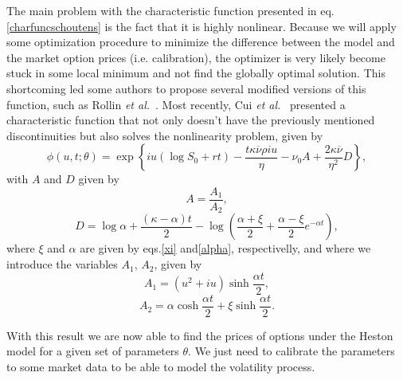 The main problem with the characteristic function presented in eq.\eqref{charfuncschoutens} is the fact that it is highly nonlinear. Because we will apply some optimization procedure to minimize the difference between the model and the market option prices (i.e. calibration), the optimizer is very likely become stuck in some local minimum and not find the globally optimal solution.
This shortcoming led some authors to propose several modified versions of this function, such as Rollin \textit{et al.}~\citep{Rollin}. Most recently, Cui \textit{et al.}~\citep{Cui} presented a characteristic function that not only doesn't have the previously mentioned discontinuities but also solves the nonlinearity problem, given by
\begin{equation}
\phi(u,t;\theta)=\exp\left\{iu\left(\log S_0+rt\right)-\frac{t\kappa\overline{\nu}\rho iu}{\eta}-\nu_0A+\frac{2\kappa\overline{\nu}}{\eta^2}D\right\},
\end{equation}
\noindent with $A$ and $D$ given by
\begin{equation}
A=\frac{A_1}{A_2},
\end{equation}
\begin{equation}
D=\log \alpha+\frac{(\kappa-\alpha) t}{2}-\log\left(\frac{\alpha+\xi}{2}+\frac{\alpha-\xi}{2}e^{-\alpha t}\right),
\end{equation}
\noindent where $\xi$ and $\alpha$ are given by eqs.\eqref{xi} and\eqref{alpha}, respectivelly, and where we introduce the variables $A_1$, $A_2$, given by
\begin{equation}
A_1=(u^2+iu)\sinh\frac{\alpha t}{2},
\end{equation}
\begin{equation}
A_2=\alpha\cosh\frac{\alpha t}{2}+\xi\sinh\frac{\alpha t}{2}.
\end{equation}

With this result we are now able to find the prices of options under the Heston model for a given set of parameters $\theta$. We just need to calibrate the parameters to some market data to be able to model the volatility process.


